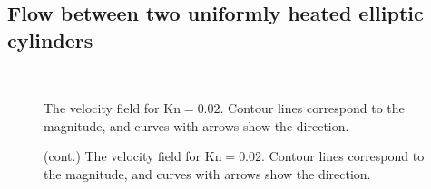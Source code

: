 \documentclass[10pt]{article}
\newcommand{\Kn}{\mathrm{Kn}}
\begin{document}
\subsection{Flow between two uniformly heated elliptic cylinders}

\begin{figure}
    \centering
    \\
    \caption{The velocity field for \(\Kn=0.02\).
        Contour lines correspond to the magnitude, and curves with arrows show the direction.}
\end{figure}

\begin{figure}
    \ContinuedFloat %
    \caption{(cont.) The velocity field for \(\Kn=0.02\).
        Contour lines correspond to the magnitude, and curves with arrows show the direction.}
    \label{fig:elliptic:flow}
\end{figure}
\end{document}
